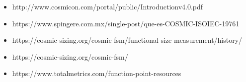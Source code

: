 \documentclass{mylib/reporteCorto}
\begin{document}
\begin{itemize}
	\item http://www.cosmicon.com/portal/public/Introductionv4.0.pdf
	\item https://www.spingere.com.mx/single-post/que-es-COSMIC-ISOIEC-19761
	\item https://cosmic-sizing.org/cosmic-fsm/functional-size-measurement/history/
	\item https://cosmic-sizing.org/cosmic-fsm/
	\item https://www.totalmetrics.com/function-point-resources
\end{itemize}
\end{document}

